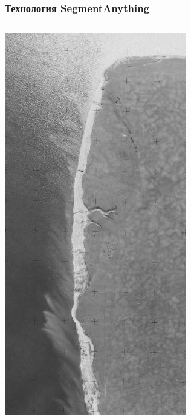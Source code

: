 \documentclass[10pt]{beamer}
\begin{document}
\begin{frame}
  \frametitle{Технология SegmentAnything}
  \begin{columns}
    \begin{column}{0.25\linewidth}
      \includegraphics[width=1\linewidth]{photo-source.png}

\end{column}
\end{columns}
\end{frame}
\end{document}
